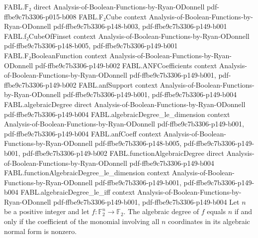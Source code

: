 \begin{theorem}
\label{FABL.functionAlgebraicDegree_eq_dimension_iff_anfCoeff_univ_ne_zero}
\leanok
{}
\proofstep
  {FABL.𝔽₂}
  {direct}
  {Analysis-of-Boolean-Functions-by-Ryan-ODonnell}
  {pdf-ffbe9c7b3306-p015-b008}
\proofstep
  {FABL.F₂Cube}
  {context}
  {Analysis-of-Boolean-Functions-by-Ryan-ODonnell}
  {pdf-ffbe9c7b3306-p148-b003,
    pdf-ffbe9c7b3306-p149-b001}
\proofstep
  {FABL.f₂CubeOfFinset}
  {context}
  {Analysis-of-Boolean-Functions-by-Ryan-ODonnell}
  {pdf-ffbe9c7b3306-p148-b005,
    pdf-ffbe9c7b3306-p149-b001}
\proofstep
  {FABL.F₂BooleanFunction}
  {context}
  {Analysis-of-Boolean-Functions-by-Ryan-ODonnell}
  {pdf-ffbe9c7b3306-p149-b002}
\proofstep
  {FABL.ANFCoefficients}
  {context}
  {Analysis-of-Boolean-Functions-by-Ryan-ODonnell}
  {pdf-ffbe9c7b3306-p149-b001,
    pdf-ffbe9c7b3306-p149-b002}
\proofstep
  {FABL.anfSupport}
  {context}
  {Analysis-of-Boolean-Functions-by-Ryan-ODonnell}
  {pdf-ffbe9c7b3306-p149-b001,
    pdf-ffbe9c7b3306-p149-b004}
\proofstep
  {FABL.algebraicDegree}
  {direct}
  {Analysis-of-Boolean-Functions-by-Ryan-ODonnell}
  {pdf-ffbe9c7b3306-p149-b004}
\proofstep
  {FABL.algebraicDegree_le_dimension}
  {context}
  {Analysis-of-Boolean-Functions-by-Ryan-ODonnell}
  {pdf-ffbe9c7b3306-p149-b001,
    pdf-ffbe9c7b3306-p149-b004}
\proofstep
  {FABL.anfCoeff}
  {context}
  {Analysis-of-Boolean-Functions-by-Ryan-ODonnell}
  {pdf-ffbe9c7b3306-p148-b005,
    pdf-ffbe9c7b3306-p149-b001,
    pdf-ffbe9c7b3306-p149-b002}
\proofstep
  {FABL.functionAlgebraicDegree}
  {direct}
  {Analysis-of-Boolean-Functions-by-Ryan-ODonnell}
  {pdf-ffbe9c7b3306-p149-b004}
\proofstep
  {FABL.functionAlgebraicDegree_le_dimension}
  {context}
  {Analysis-of-Boolean-Functions-by-Ryan-ODonnell}
  {pdf-ffbe9c7b3306-p149-b001,
    pdf-ffbe9c7b3306-p149-b004}
\proofstep
  {FABL.algebraicDegree_le_iff}
  {context}
  {Analysis-of-Boolean-Functions-by-Ryan-ODonnell}
  {pdf-ffbe9c7b3306-p149-b001,
    pdf-ffbe9c7b3306-p149-b004}
Let $n$ be a positive integer and let $f:\mathbb{F}_2^n\to\mathbb{F}_2$. The algebraic
degree of $f$ equals $n$ if and only if the coefficient of the monomial involving all
$n$ coordinates in its algebraic normal form is nonzero.
\end{theorem}


